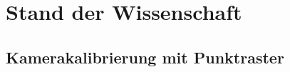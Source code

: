 \section{Stand der Wissenschaft} \label{sec:StateOfTheArt}


\subsection{Kamerakalibrierung mit Punktraster}\label{sec:SOTALabor}


\newpage
